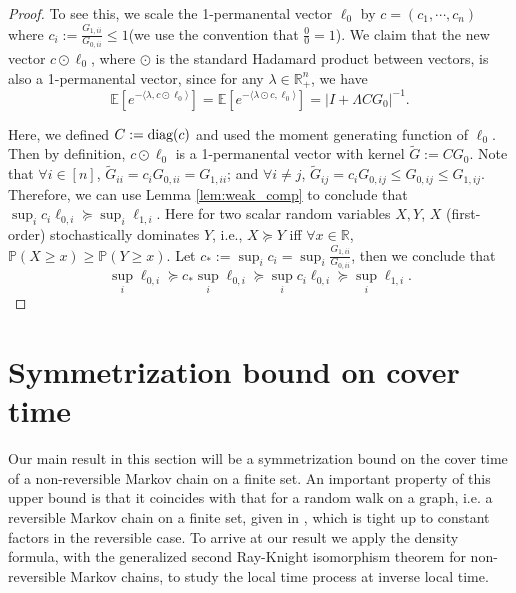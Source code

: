 \documentclass[a4paper, 11pt]{article}
\renewcommand{\P}{\mathbb{P}}
\newcommand{\E}{\mathbb{E}}
\newcommand{\diag}{\textnormal{diag}}
\begin{document}
\begin{proof}
To see this, we scale the 1-permanental vector $\ell_0$ by $c=(c_1,\cdots, c_n)$ where $c_i:=\frac{G_{1,ii}}{G_{0,ii}}\leq 1$(we use the convention that $\frac{0}{0}=1$). We claim that the new vector $c\odot\ell_0$, where $\odot$ is the standard Hadamard product between vectors, is also a 1-permanental vector, since for any $\lambda\in\mathbb{R}_+^n$, we have
\[\E[e^{-\langle \lambda, c\odot \ell_0\rangle}]=\E[e^{-\langle \lambda\odot c, \ell_0\rangle}]=|I+\Lambda C G_0|^{-1}.\]

Here, we defined $C:=\diag(c)$ and used the moment generating function of $\ell_0$. Then by definition, $c\odot\ell_0$ is a 1-permanental vector with kernel $\tilde{G}:=CG_0$. Note that $\forall i\in[n]$, $\tilde{G}_{ii}=c_iG_{0,ii}=G_{1,ii}$; and $\forall i\neq j$, $\tilde{G}_{ij}=c_iG_{0,ij}\leq G_{0,ij}\leq G_{1,ij}$. Therefore, we can use Lemma \ref{lem:weak_comp} to conclude that $\sup_i c_i\ell_{0,i}\succeq \sup_i \ell_{1,i}$. Here for two scalar random variables $X,Y$, $X$ (first-order) stochastically dominates $Y$, i.e., $X\succeq Y$ iff $\forall x\in \mathbb{R}$, $\P(X\geq x)\geq \P(Y\geq x)$. Let $c_*:=\sup_i c_i=\sup_i \frac{G_{1,ii}}{G_{0,ii}}$, then we conclude that
\[\sup_i \ell_{0,i}\succeq c_*\sup_i \ell_{0,i}\succeq\sup_i c_i\ell_{0,i}\succeq \sup_i \ell_{1,i}.\]
\end{proof}

\section{Symmetrization bound on cover time}

Our main result in this section will be a symmetrization bound on the cover time of a non-reversible Markov chain on a finite set. An important property of this upper bound is that it coincides with that for a random walk on a graph, i.e. a reversible Markov chain on a finite set, given in \cite{dlp11}, which is tight up to constant factors in the reversible case. To arrive at our result we apply the density formula, with the generalized second Ray-Knight isomorphism theorem for non-reversible Markov chains, to study the local time process at inverse local time.
\end{document}
